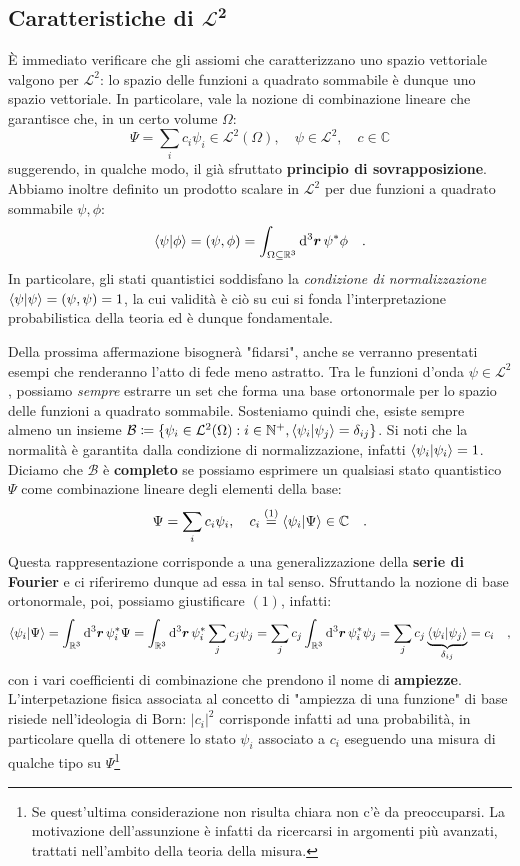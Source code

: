 \subsection{Caratteristiche di \texorpdfstring{$\bm{\mathcal{L}^2}$}{L2}}
È immediato verificare che gli assiomi che caratterizzano uno spazio vettoriale valgono per $\mathcal{L}^2$: lo spazio delle funzioni a quadrato sommabile è dunque uno spazio vettoriale. In particolare, vale la nozione di combinazione lineare che garantisce che, in un certo volume $\Omega$:
\[
    \Psi = \sum_i c_i \psi_i \in \mathcal{L}^2(\Omega), \quad \psi \in \mathcal{L}^2, \quad c \in \mathbb{C} 
\]
suggerendo, in qualche modo, il già sfruttato \textbf{principio di sovrapposizione}. 
Abbiamo inoltre definito un prodotto scalare in $\mathcal{L}^2$ per due funzioni a quadrato sommabile $\psi, \phi$:
\[
    \bra{\psi}\ket{\phi} = (\psi,\phi) = \int_{\Omega \subseteq \mathbb{R}^3} \dd^3{\bm{r}} \, \psi^*\phi \quad.
\]
In particolare, gli stati quantistici soddisfano la \emph{condizione di normalizzazione} $\bra{\psi}\ket{\psi} = (\psi,\psi) = 1$, la cui validità è ciò su cui si fonda l'interpretazione probabilistica della teoria ed è dunque fondamentale. 

Della prossima affermazione bisognerà "fidarsi", anche se verranno presentati esempi che renderanno l'atto di fede meno astratto. Tra le funzioni d'onda $\psi \in \mathcal{L}^2$, possiamo \emph{sempre} estrarre un set che forma una base ortonormale per lo spazio delle funzioni a quadrato sommabile. Sosteniamo quindi che, esiste sempre almeno un insieme $\mathcal{B} \coloneq \{ \psi_i \in \mathcal{L}^2(\Omega) : i \in \mathbb{N}^+, \bra{\psi_i}\ket{\psi_j} = \delta_{ij} \}$. Si noti che la normalità è garantita dalla condizione di normalizzazione, infatti $\bra{\psi_i}\ket{\psi_i} = 1$. Diciamo che $\mathcal{B}$ è \textbf{completo} se possiamo esprimere un qualsiasi stato quantistico $\Psi$ come combinazione lineare degli elementi della base:
\begin{equation}
    \Psi = \sum_i c_i{\psi_i}, \quad c_i \overset{(1)}{=} \bra{\psi_i}\ket{\Psi} \in \mathbb{C} \quad.
    \label{eq:psi_vec}
\end{equation}
Questa rappresentazione corrisponde a una generalizzazione della \textbf{serie di Fourier} e ci riferiremo dunque ad essa in tal senso. Sfruttando la nozione di base ortonormale, poi, possiamo giustificare $(1)$, infatti:
\[
    \bra{\psi_i}\ket{\Psi} = \int_{\mathbb{R}^3} \dd^3{\bm{r}} \, \psi_i^* \Psi = \int_{\mathbb{R}^3} \dd^3{\bm{r}} \,\psi_i^* \sum_j c_j \psi_j = \sum_j c_j \int_{\mathbb{R}^3} \dd^3{\bm{r}} \, \psi_i^* \psi_j = \sum_j c_j \underbrace{\bra{\psi_i}\ket{\psi_j}}_{\delta_{ij}} = c_i \quad,
\]
con i vari coefficienti di combinazione che prendono il nome di \textbf{ampiezze}. L'interpetazione fisica associata al concetto di "ampiezza di una funzione" di base risiede nell'ideologia di Born: $|c_i|^2$ corrisponde infatti ad una probabilità, in particolare quella di ottenere lo stato $\psi_i$ associato a $c_i$ eseguendo una misura di qualche tipo su $\Psi$\footnote{Se quest'ultima considerazione non risulta chiara non c'è da preoccuparsi. La motivazione dell'assunzione è infatti da ricercarsi in argomenti più avanzati, trattati nell'ambito della teoria della misura.}


